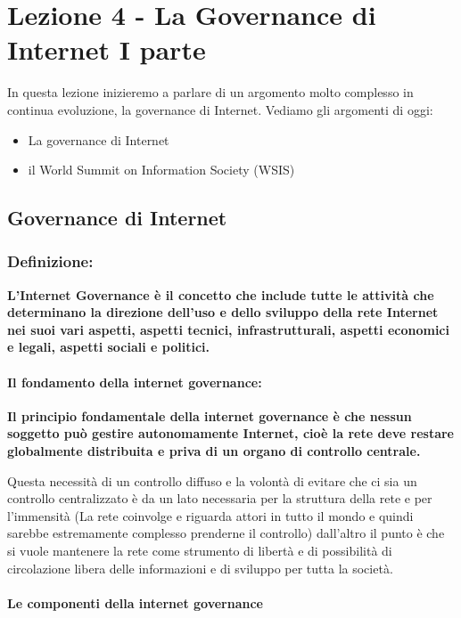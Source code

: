 \chapter{Lezione 4 - La Governance di Internet I parte}

In questa lezione inizieremo a parlare di un argomento molto complesso in continua evoluzione, la governance di Internet. Vediamo gli argomenti di oggi:

\begin{itemize}
    \item La governance di Internet
    \item il World Summit on Information Society (WSIS)
\end{itemize}

\section{Governance di Internet}

\subsection{Definizione:}

\textbf{L'Internet Governance è il concetto che include tutte le attività che determinano la direzione dell'uso e dello sviluppo della rete Internet nei suoi vari aspetti, aspetti tecnici, infrastrutturali, aspetti economici e legali, aspetti sociali e politici.}

\subsubsection{Il fondamento della internet governance:}

\textbf{Il principio fondamentale della internet governance è che nessun soggetto può gestire autonomamente Internet, cioè la rete deve restare globalmente distribuita e priva di un organo di controllo centrale.} 

Questa necessità di un controllo diffuso e la volontà di evitare che ci sia un controllo centralizzato è da un lato necessaria per la struttura della rete e per l'immensità (La rete coinvolge e riguarda attori in tutto il mondo e quindi sarebbe estremamente complesso prenderne il controllo) dall'altro il punto è che si vuole mantenere la rete come strumento di libertà e di possibilità di circolazione libera delle informazioni e di sviluppo per tutta la società.

\subsubsection{Le componenti della internet governance}

